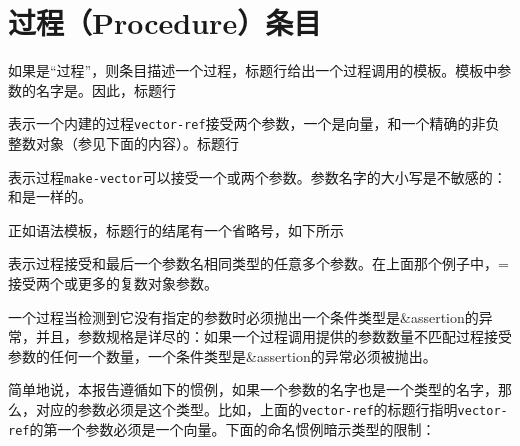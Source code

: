 \section{过程（Procedure）条目}

如果是“过程”，则条目描述一个过程，标题行给出一个过程调用的模板。模板中参数的名字是。因此，标题行

\noindent{}\unpenalty

表示一个内建的过程{\tt vector-ref}接受两个参数，一个是向量，和一个精确的非负整数对象（参见下面的内容）。标题行

\noindent%
\unpenalty

表示过程{\tt make-vector}可以接受一个或两个参数。参数名字的大小写是不敏感的：和是一样的。

正如语法模板，标题行的结尾有一个省略号\dotsfoo{}，如下所示

\noindent{}\unpenalty

表示过程接受和最后一个参数名相同类型的任意多个参数。在上面那个例子中，{\cf =}接受两个或更多的复数对象参数。

\label{typeconventions}
一个过程当检测到它没有指定的参数时必须抛出一个条件类型是{\cf\&assertion}的异常，并且，参数规格是详尽的：如果一个过程调用提供的参数数量不匹配过程接受参数的任何一个数量，一个条件类型是{\cf\&assertion}的异常必须被抛出。

简单地说，本报告遵循如下的惯例，如果一个参数的名字也是一个类型的名字，那么，对应的参数必须是这个类型。比如，上面的{\tt vector-ref}的标题行指明{\tt vector-ref}的第一个参数必须是一个向量。下面的命名惯例暗示类型的限制：

